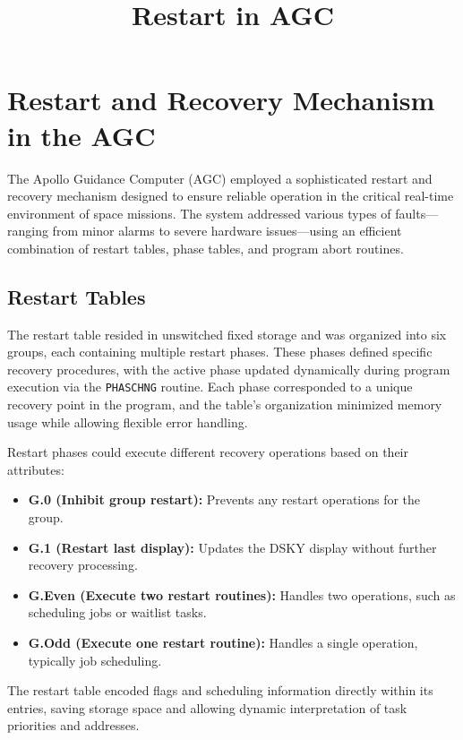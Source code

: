 \documentclass[oxford]{ahsan}
\title{Restart in AGC}
\begin{document}
\maketitle

\section{Restart and Recovery Mechanism in the AGC}

The Apollo Guidance Computer (AGC) employed a sophisticated restart and recovery
mechanism designed to ensure reliable operation in the critical real-time environment
of space missions. The system addressed various types of faults—ranging from minor
alarms to severe hardware issues—using an efficient combination of restart tables,
phase tables, and program abort routines.

\subsection{Restart Tables}

The restart table resided in unswitched fixed storage and was organized into six
groups, each containing multiple restart phases. These phases defined specific recovery
procedures, with the active phase updated dynamically during program execution via the
\texttt{PHASCHNG} routine. Each phase corresponded to a unique recovery point in the
program, and the table's organization minimized memory usage while allowing flexible
error handling.

Restart phases could execute different recovery operations based on their attributes:
\begin{itemize}
    \item \textbf{G.0 (Inhibit group restart):} Prevents any restart operations for the
        group.
    \item \textbf{G.1 (Restart last display):} Updates the DSKY display without further
        recovery processing.
    \item \textbf{G.Even (Execute two restart routines):} Handles two operations, such
        as scheduling jobs or waitlist tasks.
    \item \textbf{G.Odd (Execute one restart routine):} Handles a single operation,
        typically job scheduling.
\end{itemize}

The restart table encoded flags and scheduling information directly within its entries,
saving storage space and allowing dynamic interpretation of task priorities and
addresses.
\end{document}

